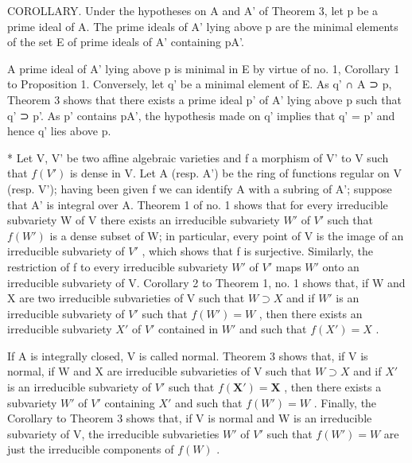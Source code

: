 COROLLARY. Under the hypotheses on A and A' of Theorem 3, let p be a prime ideal of A. The prime ideals of A' lying above p are the minimal elements of the set E of prime ideals of A' containing pA'.

A prime ideal of A' lying above p is minimal in E by virtue of no. 1, Corollary 1 to Proposition 1. Conversely, let q' be a minimal element of E. As q' ∩ A ⊃ p, Theorem 3 shows that there exists a prime ideal p' of A' lying above p such that q' ⊃ p'. As p' contains pA', the hypothesis made on q' implies that q' = p' and hence q' lies above p.

* Let V, V' be two affine algebraic varieties and f a morphism of V' to V such that \(f(V')\) is dense in V. Let A (resp. A') be the ring of functions regular on V (resp. V'); having been given f we can identify A with a subring of A'; suppose that A' is integral over A. Theorem 1 of no. 1 shows that for every irreducible subvariety W of V there exists an irreducible subvariety \(W'\) of \(V'\) such that \(f(W')\) is a dense subset of W; in particular, every point of V is the image of an irreducible subvariety of \(V'\) , which shows that f is surjective. Similarly, the restriction of f to every irreducible subvariety \(W'\) of \(V'\) maps \(W'\) onto an irreducible subvariety of V. Corollary 2 to Theorem 1, no. 1 shows that, if W and X are two irreducible subvarieties of V such that \(W \supset X\) and if \(W'\) is an irreducible subvariety of \(V'\) such that \(f(W') = W\) , then there exists an irreducible subvariety \(X'\) of \(V'\) contained in \(W'\) and such that \(f(X') = X\) .

If A is integrally closed, V is called normal. Theorem 3 shows that, if V is normal, if W and X are irreducible subvarieties of V such that \(W \supset X\) and if \(X'\) is an irreducible subvariety of \(V'\) such that \(f(\mathbf{X}') = \mathbf{X}\) , then there exists a subvariety \(W'\) of \(V'\) containing \(X'\) and such that \(f(W') = W\) . Finally, the Corollary to Theorem 3 shows that, if V is normal and W is an irreducible subvariety of V, the irreducible subvarieties \(W'\) of \(V'\) such that \(f(W') = W\) are just the irreducible components of \(f(W)\) .

